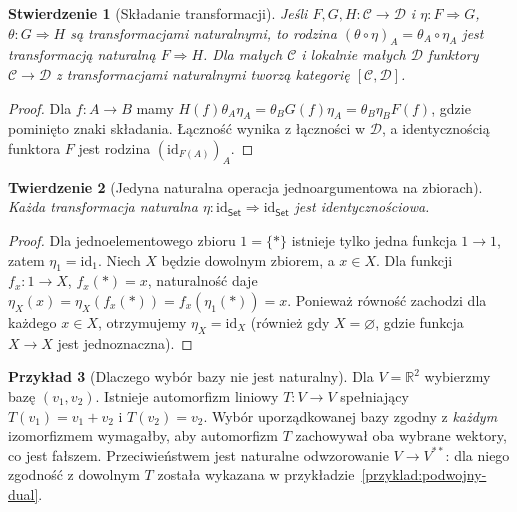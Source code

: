 \documentclass[11pt,a4paper]{article}
\numberwithin{equation}{section}
\theoremstyle{plain}
\newtheorem{twierdzenie}{Twierdzenie}[section]
\newtheorem{stwierdzenie}[twierdzenie]{Stwierdzenie}
\theoremstyle{definition}
\newtheorem{przyklad}[twierdzenie]{Przykład}
\theoremstyle{remark}
\newcommand{\cat}[1]{\mathsf{#1}}
\newcommand{\Set}{\cat{Set}}
\newcommand{\id}{\mathrm{id}}
\begin{document}
\begin{stwierdzenie}[Składanie transformacji]
Jeśli $F,G,H:\mathcal C\to\mathcal D$ i $\eta:F\Rightarrow G$, $\theta:G\Rightarrow H$ są transformacjami naturalnymi, to rodzina $(\theta\circ\eta)_A=\theta_A\circ\eta_A$ jest transformacją naturalną $F\Rightarrow H$. Dla małych $\mathcal C$ i lokalnie małych $\mathcal D$ funktory $\mathcal C\to\mathcal D$ z transformacjami naturalnymi tworzą kategorię $[\mathcal C,\mathcal D]$.
\end{stwierdzenie}
\begin{proof}
Dla $f:A\to B$ mamy $H(f)\theta_A\eta_A=\theta_B G(f)\eta_A=\theta_B\eta_B F(f)$, gdzie pominięto znaki składania. Łączność wynika z łączności w $\mathcal D$, a identycznością funktora $F$ jest rodzina $(\id_{F(A)})_A$.
\end{proof}


\begin{twierdzenie}[Jedyna naturalna operacja jednoargumentowa na zbiorach]\label{tw:only-id-set}
Każda transformacja naturalna $\eta:\id_{\Set}\Rightarrow\id_{\Set}$ jest identycznościowa.
\end{twierdzenie}
\begin{proof}
Dla jednoelementowego zbioru $1=\{*\}$ istnieje tylko jedna funkcja $1\to1$, zatem $\eta_1=\id_1$. Niech $X$ będzie dowolnym zbiorem, a $x\in X$. Dla funkcji $f_x:1\to X$, $f_x(*)=x$, naturalność daje $\eta_X(x)=\eta_X(f_x(*))=f_x(\eta_1(*))=x$. Ponieważ równość zachodzi dla każdego $x\in X$, otrzymujemy $\eta_X=\id_X$ (również gdy $X=\varnothing$, gdzie funkcja $X\to X$ jest jednoznaczna).
\end{proof}

\begin{przyklad}[Dlaczego wybór bazy nie jest naturalny]
Dla $V=\mathbb R^2$ wybierzmy bazę $(v_1,v_2)$. Istnieje automorfizm liniowy $T:V\to V$ spełniający $T(v_1)=v_1+v_2$ i $T(v_2)=v_2$. Wybór uporządkowanej bazy zgodny z \emph{każdym} izomorfizmem wymagałby, aby automorfizm $T$ zachowywał oba wybrane wektory, co jest fałszem. Przeciwieństwem jest naturalne odwzorowanie $V\to V^{**}$: dla niego zgodność z dowolnym $T$ została wykazana w przykładzie~\ref{przyklad:podwojny-dual}.
\end{przyklad}
\end{document}
